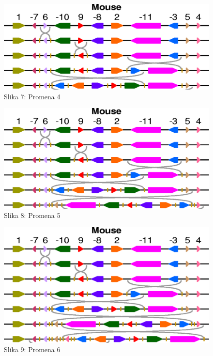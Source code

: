 \documentclass{article}
\begin{document}
\begin{figure}[h!]
\centering
\includegraphics[scale=0.32]{slike/niz4.png}
\caption{Slika 7: Promena 4}
\label{slika:X}
\end{figure}

\begin{figure}[h!]
\centering
\includegraphics[scale=0.32]{slike/niz5.png}
\caption{Slika 8: Promena 5}
\label{slika:X}
\end{figure}

\begin{figure}[h!]
\centering
\includegraphics[scale=0.32]{slike/niz6.png}
\caption{Slika 9: Promena 6}
\label{slika:X}
\end{figure}
\end{document}
